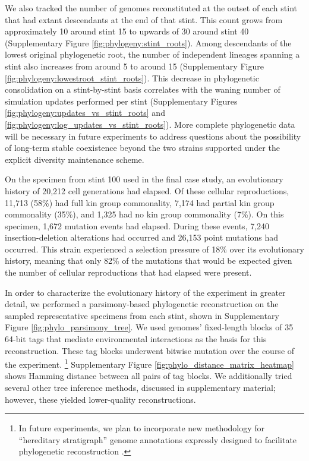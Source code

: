 We also tracked the number of genomes reconstituted at the outset of each stint that had extant descendants at the end of that stint.
This count grows from approximately 10 around stint 15 to upwards of 30 around stint 40 (Supplementary Figure \ref{fig:phylogeny:stint_roots}).
Among descendants of the lowest original phylogenetic root, the number of independent lineages spanning a stint also increases from around 5 to around 15
(Supplementary Figure \ref{fig:phylogeny:lowestroot_stint_roots}).
This decrease in phylogenetic consolidation on a stint-by-stint basis correlates with the waning number of simulation updates performed per stint (Supplementary Figures \ref{fig:phylogeny:updates_vs_stint_roots} and \ref{fig:phylogeny:log_updates_vs_stint_roots}).
More complete phylogenetic data will be necessary in future experiments to address questions about the possibility of long-term stable coexistence beyond the two strains supported under the explicit diversity maintenance scheme.

On the specimen from stint 100 used in the final case study, an evolutionary history of 20,212 cell generations had elapsed.
Of these cellular reproductions, 11,713 (58\%) had full kin group commonality, 7,174 had partial kin group commonality (35\%), and 1,325 had no kin group commonality (7\%).
On this specimen, 1,672 mutation events had elapsed.
During these events, 7,240 insertion-deletion alterations had occurred and 26,153 point mutations had occurred.
This strain experienced a selection pressure of 18\% over its evolutionary history, meaning that only 82\% of the mutations that would be expected given the number of cellular reproductions that had elapsed were present.

In order to characterize the evolutionary history of the experiment in greater detail, we performed a parsimony-based phylogenetic reconstruction on the sampled representative specimens from each stint, shown in Supplementary  Figure \ref{fig:phylo_parsimony_tree}.
We used genomes' fixed-length blocks of 35 64-bit tags that mediate environmental interactions as the basis for this reconstruction.
These tag blocks underwent bitwise mutation over the course of the experiment.%
\footnote{
In future experiments, we plan to incorporate new methodology for ``hereditary stratigraph'' genome annotations expressly designed to facilitate phylogenetic reconstruction .
}
Supplementary Figure \ref{fig:phylo_distance_matrix_heatmap} shows Hamming distance between all pairs of tag blocks.
We additionally tried several other tree inference methods, discussed in supplementary material; however, these yielded lower-quality reconstructions.

